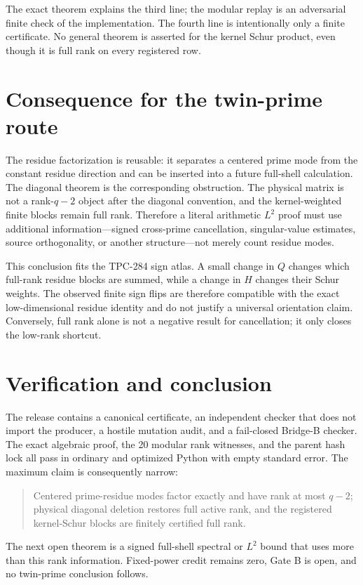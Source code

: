 \documentclass[11pt]{article}
\begin{document}
The exact theorem explains the third line; the modular replay is an adversarial
finite check of the implementation.  The fourth line is intentionally only a
finite certificate.  No general theorem is asserted for the kernel Schur
product, even though it is full rank on every registered row.

\section{Consequence for the twin-prime route}

The residue factorization is reusable: it separates a centered prime mode from
the constant residue direction and can be inserted into a future full-shell
calculation.  The diagonal theorem is the corresponding obstruction.  The
physical matrix is not a rank-$q-2$ object after the diagonal convention, and
the kernel-weighted finite blocks remain full rank.  Therefore a literal
arithmetic $L^2$ proof must use additional information—signed cross-prime
cancellation, singular-value estimates, source orthogonality, or another
structure—not merely count residue modes.

This conclusion fits the TPC-284 sign atlas.  A small change in $Q$ changes
which full-rank residue blocks are summed, while a change in $H$ changes their
Schur weights.  The observed finite sign flips are therefore compatible with
the exact low-dimensional residue identity and do not justify a universal
orientation claim.  Conversely, full rank alone is not a negative result for
cancellation; it only closes the low-rank shortcut.

\section{Verification and conclusion}

The release contains a canonical certificate, an independent checker that does
not import the producer, a hostile mutation audit, and a fail-closed Bridge-B
checker.  The exact algebraic proof, the 20 modular rank witnesses, and the
parent hash lock all pass in ordinary and optimized Python with empty standard
error.  The maximum claim is consequently narrow:

\begin{quote}
Centered prime-residue modes factor exactly and have rank at most $q-2$;
physical diagonal deletion restores full active rank, and the registered
kernel-Schur blocks are finitely certified full rank.
\end{quote}

The next open theorem is a signed full-shell spectral or $L^2$ bound that uses
more than this rank information.  Fixed-power credit remains zero, Gate B is
open, and no twin-prime conclusion follows.



\end{document}
